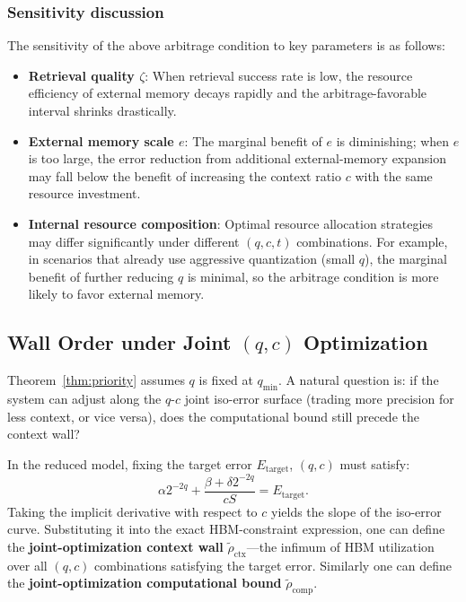 \documentclass[11pt,a4paper]{article}
\theoremstyle{plain}
\theoremstyle{definition}
\begin{document}
\subsubsection*{Sensitivity discussion}
The sensitivity of the above arbitrage condition to key parameters is as follows:
\begin{itemize}
    \item \textbf{Retrieval quality $\zeta$}: When retrieval success rate is low, the resource efficiency of external memory decays rapidly and the arbitrage-favorable interval shrinks drastically.
    \item \textbf{External memory scale $e$}: The marginal benefit of $e$ is diminishing; when $e$ is too large, the error reduction from additional external-memory expansion may fall below the benefit of increasing the context ratio $c$ with the same resource investment.
    \item \textbf{Internal resource composition}: Optimal resource allocation strategies may differ significantly under different $(q, c, t)$ combinations. For example, in scenarios that already use aggressive quantization (small $q$), the marginal benefit of further reducing $q$ is minimal, so the arbitrage condition is more likely to favor external memory.
\end{itemize}

\subsection{Wall Order under Joint $(q,c)$ Optimization}\label{sec:joint}

Theorem~\ref{thm:priority} assumes $q$ is fixed at $q_{\min}$. A natural question is: if the system can adjust along the $q$-$c$ joint iso-error surface (trading more precision for less context, or vice versa), does the computational bound still precede the context wall?

In the reduced model, fixing the target error $E_{\text{target}}$, $(q,c)$ must satisfy:
\[
\alpha 2^{-2q} + \frac{\beta + \delta 2^{-2q}}{c S} = E_{\text{target}}.
\]
Taking the implicit derivative with respect to $c$ yields the slope of the iso-error curve. Substituting it into the exact HBM-constraint expression, one can define the \textbf{joint-optimization context wall} $\tilde{\rho}_{\text{ctx}}$---the infimum of HBM utilization over all $(q,c)$ combinations satisfying the target error. Similarly one can define the \textbf{joint-optimization computational bound} $\tilde{\rho}_{\text{comp}}$.
\end{document}

